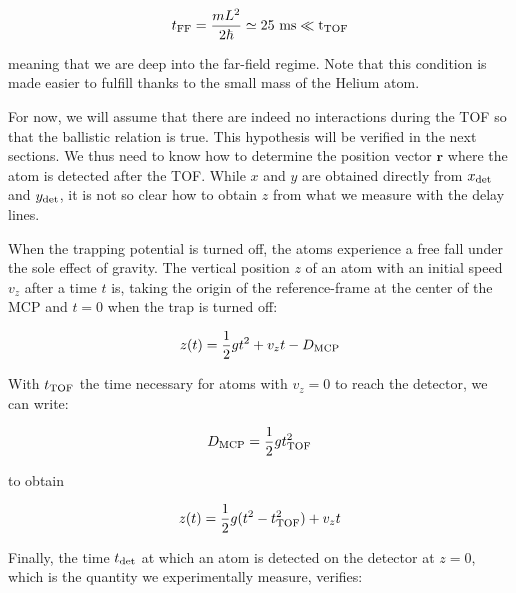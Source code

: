 \begin{equation}
    t_{\rm{FF}} = \frac{mL^2}{2 \hbar} \simeq 25 \ \rm{ms} \ll t_{\rm{TOF}}
\end{equation}

\noindent meaning that we are deep into the far-field regime. Note that this condition is made easier to fulfill thanks to the small mass of the Helium atom. 

For now, we will assume that there are indeed no interactions during the TOF so that the ballistic relation is true. This hypothesis will be verified in the next sections. We thus need to know how to determine the position vector $\bm{r}$ where the atom is detected after the TOF. While $x$ and $y$ are obtained directly from $x_{\rm{det}}$ and $y_{\rm{det}}$, it is not so clear how to obtain $z$ from what we measure with the delay lines.


When the trapping potential is turned off, the atoms experience a free fall under the sole effect of gravity. The vertical position $z$ of an atom with an initial speed $v_z$ after a time $t$ is, taking the origin of the reference-frame at the center of the MCP and $t=0$ when the trap is turned off:

\begin{equation}
    z(t)= \frac{1}{2} gt^2 + v_z t -  D_{\rm{MCP}}
\end{equation}


\noindent With $t_{\rm{TOF}}$ the time necessary for atoms with $v_z=0$ to reach the detector, we can write:

\begin{equation}
    D_{\rm{MCP}} = \frac{1}{2} g t_{\rm{TOF}}^2
\end{equation}

\noindent to obtain

\begin{equation}
     z(t)= \frac{1}{2} g(t^2-t_{\rm{TOF}}^2) + v_z t
\end{equation}


\noindent Finally, the time $t_{\rm{det}}$ at which an atom is detected on the detector at $z=0$, which is the quantity we experimentally measure, verifies:

